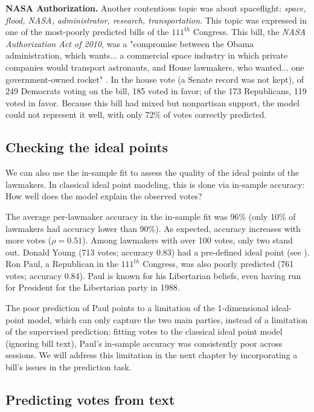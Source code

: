 \textbf{NASA Authorization.}
Another contentious topic was about spaceflight: \emph{space, flood,
NASA, administrator, research, transportation}.
This topic was expressed in one of the most-poorly predicted bills of
the $111^{th}$ Congress.  This bill, the \emph{NASA Authorization Act
of 2010}, was a "compromise between the Obama administration, which
wants... a commercial space industry in which private companies would
transport astronauts, and House lawmakers, who wanted... one
government-owned rocket" \citep{herszenhorn:2010}.  In the house vote
(a Senate record was not kept), of 249 Democrats voting on the bill,
185 voted in favor; of the 173 Republicans, 119 voted in favor.
Because this bill had mixed but nonpartisan support, the model could
not represent it well, with only 72\% of votes correctly predicted.

\subsection*{Checking the ideal points}
We can also use the in-sample fit to assess the quality of the ideal
points of the lawmakers.  In classical ideal point modeling, this is
done via in-sample accuracy: How well does the model explain the
observed votes?

The average per-lawmaker accuracy in the in-sample fit was 96\%
(only 10\% of lawmakers had accuracy lower than 90\%).  As expected,
accuracy increases with more votes ($\rho=0.51$).  Among lawmakers
with over 100 votes, only two stand out. Donald Young (713 votes;
accuracy 0.83) had a pre-defined ideal point (see ). Ron
Paul, a Republican in the $111^{th}$ Congress, was also poorly
predicted (761 votes; accuracy 0.84).  Paul is known for his
Libertarian beliefs, even having run for President for the Libertarian
party in 1988.

The poor prediction of Paul points to a limitation of the
1-dimensional ideal-point model, which can only capture the two main
parties, instead of a limitation of the supervised prediction: fitting
votes to the classical ideal point model (ignoring bill text), Paul's
in-sample accuracy was consistently poor across sessions.  We will
address this limitation in the next chapter by incorporating a bill's
issues in the prediction task.

\subsection*{Predicting votes from text}

